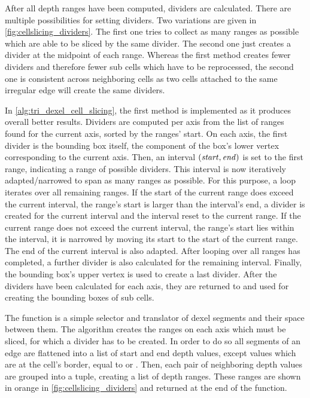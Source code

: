 After all depth ranges have been computed, dividers are calculated.
There are multiple possibilities for setting dividers.
Two variations are given in \cref{fig:cellslicing_dividers}.
The first one tries to collect as many ranges as possible which are able to be sliced by the same divider.
The second one just creates a divider at the midpoint of each range.
Whereas the first method creates fewer dividers and therefore fewer sub cells which have to be reprocessed, the second one is consistent across neighboring cells as two cells attached to the same irregular edge will create the same dividers.

In \cref{alg:tri_dexel_cell_slicing}, the first method is implemented as it produces overall better results.
Dividers are computed per axis from the list of ranges found for the current axis, sorted by the ranges' start.
On each axis, the first divider is the bounding box itself, \ie the component of the box's lower vertex corresponding to the current axis.
Then, an interval $(\mathit{start}, \mathit{end})$ is set to the first range, indicating a range of possible dividers.
This interval is now iteratively adapted/narrowed to span as many ranges as possible.
For this purpose, a loop iterates over all remaining ranges.
If the start of the current range does exceed the current interval, \ie the range's start is larger than the interval's end, a divider is created for the current interval and the interval reset to the current range.
If the current range does not exceed the current interval, \ie the range's start lies within the interval, it is narrowed by moving its start to the start of the current range.
The end of the current interval is also adapted.
After looping over all ranges has completed, a further divider is also calculated for the remaining interval.
Finally, the bounding box's upper vertex is used to create a last divider.
After the dividers have been calculated for each axis, they are returned to and used for creating the bounding boxes of sub cells.

The  function is a simple selector and translator of dexel segments and their space between them.
The algorithm creates the ranges on each axis which must be sliced, \ie for which a divider has to be created.
In order to do so all segments of an edge are flattened into a list of start and end depth values, except values which are at the cell's border, \ie equal to  or .
Then, each pair of neighboring depth values are grouped into a tuple, creating a list of depth ranges.
These ranges are shown in orange in \cref{fig:cellslicing_dividers} and returned at the end of the function.


